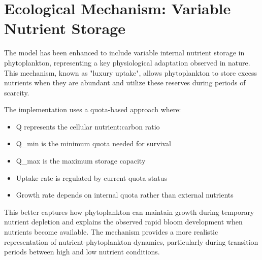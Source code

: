 \section{Ecological Mechanism: Variable Nutrient Storage}

The model has been enhanced to include variable internal nutrient storage in phytoplankton, representing a key physiological adaptation observed in nature. This mechanism, known as "luxury uptake", allows phytoplankton to store excess nutrients when they are abundant and utilize these reserves during periods of scarcity.

The implementation uses a quota-based approach where:
\begin{itemize}
    \item Q represents the cellular nutrient:carbon ratio
    \item Q\_min is the minimum quota needed for survival
    \item Q\_max is the maximum storage capacity
    \item Uptake rate is regulated by current quota status
    \item Growth rate depends on internal quota rather than external nutrients
\end{itemize}

This better captures how phytoplankton can maintain growth during temporary nutrient depletion and explains the observed rapid bloom development when nutrients become available. The mechanism provides a more realistic representation of nutrient-phytoplankton dynamics, particularly during transition periods between high and low nutrient conditions.

